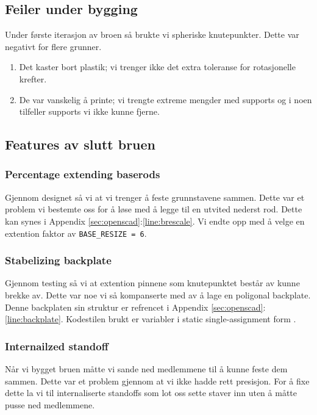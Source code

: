 \documentclass{report}
\begin{document}
\subsection {Feiler under bygging}

Under første iterasjon av broen så brukte vi spheriske knutepunkter. Dette var negativt for flere grunner.
\begin{enumerate}
	\item Det kaster bort plastik; vi trenger ikke det extra toleranse for rotasjonelle krefter.
	\item De var vanskelig å printe; vi trengte extreme mengder med supports og i noen tilfeller supports vi ikke kunne fjerne.
\end{enumerate}

\subsection {Features av slutt bruen}

\subsubsection {Percentage extending baserods}

Gjennom designet så vi at vi trenger å feste grunnstavene sammen. Dette var et problem vi bestemte oss for å løse med å legge til en utvited nederst rod. Dette kan synes i Appendix \ref{sec:openscad}:\ref{line:brescale}. Vi endte opp med å velge en extention faktor av \lstinline{BASE_RESIZE = 6}.

\subsubsection {Stabelizing backplate}

Gjennom testing så vi at extention pinnene som knutepunktet består av kunne brekke av. Dette var noe vi så kompanserte med av å lage en poligonal backplate. Denne backplaten sin struktur er refrencet i Appendix \ref{sec:openscad}:\ref{line:backplate}. Kodestilen brukt er variabler i static single-assignment form \cite{wiki:ssaf}.

\subsubsection {Internailzed standoff}

Når vi bygget bruen måtte vi sande ned medlemmene til å kunne feste dem sammen. Dette var et problem gjennom at vi ikke hadde rett presisjon. For å fixe dette la vi til internaliserte standoffs som lot oss sette staver inn uten å måtte pusse ned medlemmene.
\end{document}
